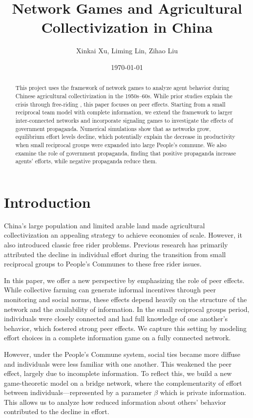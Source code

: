 \documentclass[12pt]{article}
\title{Network Games and Agricultural Collectivization in China}
\author{Xinkai Xu, Liming Lin, Zihao Liu}
\date{\today}
\begin{document}
\maketitle
\onehalfspacing

\begin{abstract}
  This project uses the framework of network games to analyze agent behavior during Chinese agricultural collectivization in the 1950s–60s. While prior studies explain the crisis through free-riding \citep{chinnDiligenceLazinessChinese1980, lin1990collectivization}, this paper focuses on peer effects. Starting from a small reciprocal team model with complete information, we extend the framework to larger inter-connected networks and incorporate signaling games to investigate the effects of government propaganda. Numerical simulations show that as networks grow, equilibrium effort levels decline, which potentially explain the decrease in productivity when small reciprocal groups were expanded into large People's commune. We also examine the role of government propaganda, finding that positive propaganda increase agents’ efforts, while negative propaganda reduce them.
\end{abstract}

\section{Introduction}
China's large population and limited arable land made agricultural collectivization an appealing strategy to achieve economies of scale. However, it also introduced classic free rider problems. Previous research has primarily attributed the decline in individual effort during the transition from small reciprocal groups to People's Communes to these free rider issues.\citep{chinnDiligenceLazinessChinese1980,lin1990collectivization}

In this paper, we offer a new perspective by emphasizing the role of peer effects. While collective farming can generate informal incentives through peer monitoring and social norms, these effects depend heavily on the structure of the network and the availability of information. In the small reciprocal groups period, individuals were closely connected and had full knowledge of one another's behavior, which fostered strong peer effects. We capture this setting by modeling effort choices in a complete information game on a fully connected network.

However, under the People's Commune system, social ties became more diffuse and individuals were less familiar with one another. This weakened the peer effect, largely due to incomplete information. To reflect this, we build a new game-theoretic model on a bridge network, where the complementarity of effort between individuals—represented by a parameter $\beta$ which is private information. This allows us to analyze how reduced information about others' behavior contributed to the decline in effort.
\end{document}
